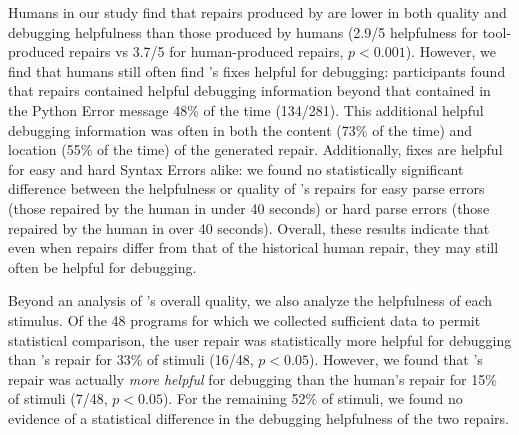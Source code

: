  Humans in our study find that repairs produced by
\toolname are lower in both quality and debugging helpfulness than those produced 
by humans (2.9/5 helpfulness for tool-produced repairs vs 3.7/5 for human-produced 
repairs, $p < 0.001$). However, we find that humans still often find \toolname's fixes 
helpful for debugging: participants found that \toolname repairs contained helpful 
debugging information beyond that contained in the Python Error message 48\% of 
the time (134/281). This additional helpful debugging information was often in both
the content (73\% of the time) and location (55\% of the time) of the generated
repair. Additionally, \toolname fixes are helpful for easy and hard Syntax Errors
alike: we found no statistically significant difference between the helpfulness or
quality of \toolname's repairs for easy parse errors (those repaired by the human in under
40 seconds) or hard parse errors (those repaired by the human in over 40 seconds). %
Overall, these results indicate that even when \toolname repairs differ from
that of the historical human repair, they may still often be helpful for debugging.

 Beyond an analysis of \toolname's overall quality, we also 
analyze the helpfulness of each stimulus. %
Of the 48 programs for which we collected sufficient data to permit statistical 
comparison, the user repair was statistically more helpful for debugging than \toolname's
repair for 33\% of stimuli (16/48, $p<0.05$). However, we found that \toolname's
repair was actually \emph{more helpful} for debugging than the human's repair for 15\% of
stimuli (7/48, $p<0.05$). For the remaining 52\% of stimuli, we found no evidence of a 
statistical difference in the debugging helpfulness of the two repairs.

